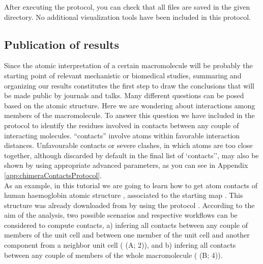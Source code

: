 After executing the protocol, you can check that all files are saved in the given directory. No additional visualization tools have been included in this protocol. 

\subsection*{Publication of results}

Since the atomic interpretation of a certain macromolecule will be probably the starting point of relevant mechanistic or biomedical studies, summaring and organizing our results constitutes the first step to draw the conclusions that will be made public by journals and talks. Many different questions can be posed based on the atomic structure. Here we are wondering about interactions among members of the macromolecule. To answer this question we have included in \scipion the protocol  to identify the residues involved in contacts between any couple of interacting molecules. ``contacts'' involve atoms within  favorable interaction distances. Unfavourable contacts or severe clashes, in which atoms are too close together, although discarded by default in the final list of `contacts'', may also be shown by using appropriate advanced parameters, as you can see in Appendix \ref{app:chimeraContactsProtocol}. \\

As an example, in this tutorial we are going to learn how to get atom contacts of human haemoglobin  atomic structure , associated to the starting map . This structure was already downloaded from  by using the protocol . According to the aim of the analysis, two possible scenarios and respective workflows can be considered to compute contacts, a) infering all contacts between any couple of members of the unit cell and between one member of the unit cell and another component from a neighbor unit cell ( (A; 2)), and b) infering all contacts between any couple of members of the whole macromolecule ( (B; 4)). 

